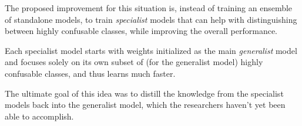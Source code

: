 \documentclass[a4paper,twocolumn]{article}
\begin{document}
The proposed improvement for this situation is, instead of training an ensemble of standalone models, to train \textit{specialist} models that can help with distinguishing between highly confusable classes, while improving the overall performance.

Each specialist model starts with weights initialized as the main \textit{generalist} model and focuses solely on its own subset of (for the generalist model) highly confusable classes, and thus learns much faster.

The ultimate goal of this idea was to distill the knowledge from the specialist models back into the generalist model, which the researchers haven't yet been able to accomplish.
\end{document}
